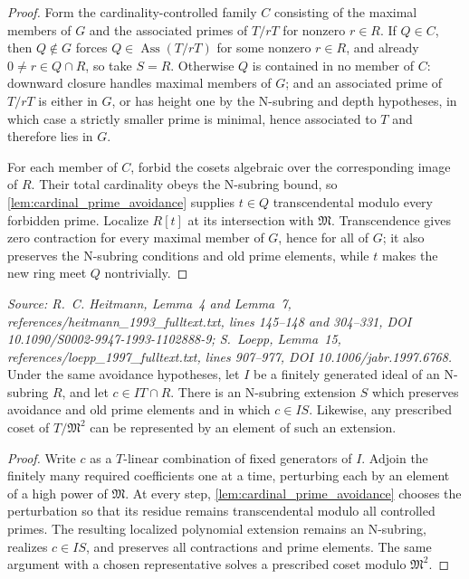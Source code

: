 \begin{proof}
  Form the cardinality-controlled family \(C\) consisting of the maximal
  members of \(G\) and the associated primes of \(T/rT\) for nonzero
  \(r\in R\).  If \(Q\in C\), then \(Q\notin G\) forces
  \(Q\in\operatorname{Ass}(T/rT)\) for some nonzero \(r\in R\), and already
  \(0\neq r\in Q\cap R\), so take \(S=R\).  Otherwise \(Q\) is contained in
  no member of \(C\): downward closure handles maximal members of \(G\); and
  an associated prime of \(T/rT\) is either in \(G\), or has height one by
  the N-subring and depth hypotheses, in which case a strictly smaller prime
  is minimal, hence associated to \(T\) and therefore lies in \(G\).

  For each member of \(C\), forbid the cosets algebraic over the
  corresponding image of \(R\).  Their total cardinality obeys the N-subring
  bound, so \cref{lem:cardinal_prime_avoidance} supplies
  \(t\in Q\) transcendental modulo every forbidden prime.  Localize
  \(R[t]\) at its intersection with \(\mathfrak M\).  Transcendence gives
  zero contraction for every maximal member of \(G\), hence for all of
  \(G\); it also preserves the N-subring conditions and old prime elements,
  while \(t\) makes the new ring meet \(Q\) nontrivially.
\end{proof}

\begin{lemma}
  \label{lem:n_subring_ideal_extension}
  \textit{Source: R.~C. Heitmann, Lemma~4 and Lemma~7,
  references/heitmann\_1993\_fulltext.txt, lines 145--148 and 304--331,
  DOI 10.1090/S0002-9947-1993-1102888-9; S.~Loepp, Lemma~15,
  references/loepp\_1997\_fulltext.txt, lines 907--977,
  DOI 10.1006/jabr.1997.6768.}
  Under the same avoidance hypotheses, let \(I\) be a finitely generated
  ideal of an N-subring \(R\), and let \(c\in IT\cap R\).  There is an
  N-subring extension \(S\) which preserves avoidance and old prime elements
  and in which \(c\in IS\).  Likewise, any prescribed coset of
  \(T/\mathfrak M^2\) can be represented by an element of such an extension.
\end{lemma}

\begin{proof}
  Write \(c\) as a \(T\)-linear combination of fixed generators of \(I\).
  Adjoin the finitely many required coefficients one at a time, perturbing
  each by an element of a high power of \(\mathfrak M\).  At every step,
  \cref{lem:cardinal_prime_avoidance} chooses the perturbation so that its
  residue remains transcendental modulo all controlled primes.  The resulting
  localized polynomial extension remains an N-subring, realizes
  \(c\in IS\), and preserves all contractions and prime elements.  The same
  argument with a chosen representative solves a prescribed coset modulo
  \(\mathfrak M^2\).
\end{proof}

